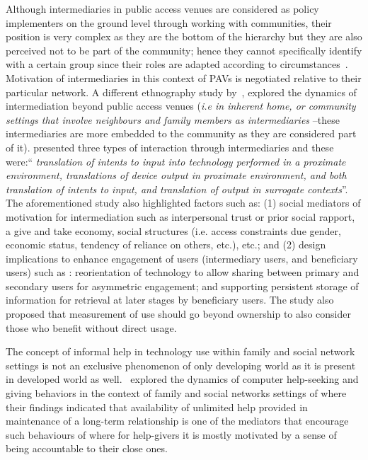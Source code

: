 Although intermediaries in public access venues are considered as policy implementers on the ground level through working with communities, their position is very complex as they are the bottom of the hierarchy but they are also perceived not to be part of the community; hence they cannot specifically identify with a certain group since their roles are adapted according to circumstances~\citep{bailur2010liminal}. Motivation of intermediaries in this context of PAVs is negotiated relative to their particular network. A different ethnography study by~\cite{sambasivan2010}, explored the dynamics of intermediation beyond public access venues (\emph{i.e in inherent home, or community settings that involve neighbours and family members as intermediaries} --these intermediaries are more embedded to the community as they are considered part of it). \cite{sambasivan2010} presented three types of interaction through intermediaries and these were:``\emph{ translation of intents to input into technology performed in a proximate environment, translations of device output in proximate environment, and both translation of intents to input, and translation of output in surrogate contexts}''. The aforementioned study also highlighted factors such as: (1) social mediators of motivation for intermediation such as interpersonal trust or prior social rapport, a give and take economy, social structures (i.e. access constraints due gender, economic status, tendency of reliance on others, etc.), etc.; and (2) design implications to enhance engagement of users (intermediary users, and beneficiary users) such as : reorientation of technology  to allow sharing between primary and secondary users for asymmetric engagement; and supporting persistent storage of information for retrieval at later stages by beneficiary users. The study also proposed that measurement of use should go beyond ownership to also consider those who benefit without direct usage. 

The concept of informal help in technology use within family and social network settings is not an exclusive phenomenon of only developing world as it is present in developed world as well.~\cite{poole:chh} explored the dynamics of computer help-seeking and giving behaviors in the context of family and social networks settings of where their findings indicated that availability of unlimited help provided in maintenance of a long-term relationship is one of the mediators that encourage such behaviours of where for help-givers it is mostly motivated by a sense of being accountable to their close ones.

